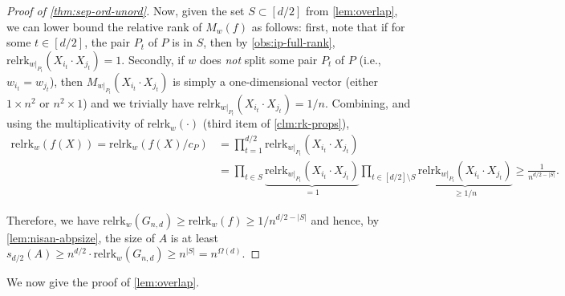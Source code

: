 \documentclass[10pt,a4paper]{article}
\theoremstyle{definition}%
\theoremstyle{plain}
\newcommand{\rk}{\mathrm{relrk}}
\begin{document}
\begin{proof}[Proof of \autoref{thm:sep-ord-unord}]
    Now, given the set $S\subset [d/2]$ from \autoref{lem:overlap}, we can lower bound the relative rank of $M_w(f)$ as follows: first, note that if for some $t\in[d/2]$, the pair $P_t$ of $P$ is in $S$, then by \autoref{obs:ip-full-rank}, $\rk_{w|_{P_t}}(X_{i_t}\cdot X_{j_t}) = 1$. 
    Secondly, if $w$ does \emph{not} split some pair $P_t$ of $P$ (i.e., $w_{i_t} = w_{j_t}$), then $M_{w|_{P_t}}(X_{i_t}\cdot X_{j_t})$ is simply a one-dimensional vector (either $1\times n^2$ or $n^2\times 1$) and we trivially have $\rk_{w|_{P_t}}(X_{i_t}\cdot X_{j_t}) = 1/n$. 
    Combining, and using the multiplicativity of $\rk_w(\cdot)$ (third item of \autoref{clm:rk-props}), 
    \begin{align*}
        \rk_w(f(X)) = \rk_w(f(X)/c_P) &= \prod_{t = 1}^{d/2} \rk_{w|_{P_t}}(X_{i_t}\cdot X_{j_t})\\
        &= \prod_{t\in S} \underbrace{\rk_{w|_{P_t}}(X_{i_t}\cdot X_{j_t})}_{= 1} \prod_{t\in[d/2]\setminus S}\underbrace{\rk_{w|_{P_t}}(X_{i_t}\cdot X_{j_t})}_{\geq 1/n}
        \geq \frac{1}{n^{d/2 - |S|}}.
    \end{align*}
    
    Therefore, we have $\rk_w(G_{n,d})\geq \rk_w(f) \geq 1/n^{d/2 - |S|}$ and hence, by \autoref{lem:nisan-abpsize}, the size of $A$ is at least $s_{d/2}(A)\geq n^{d/2}\cdot \rk_w(G_{n,d}) \geq n^{|S|} = n^{\Omega(d)}$.
\end{proof}

We now give the proof of \autoref{lem:overlap}.
\end{document}
